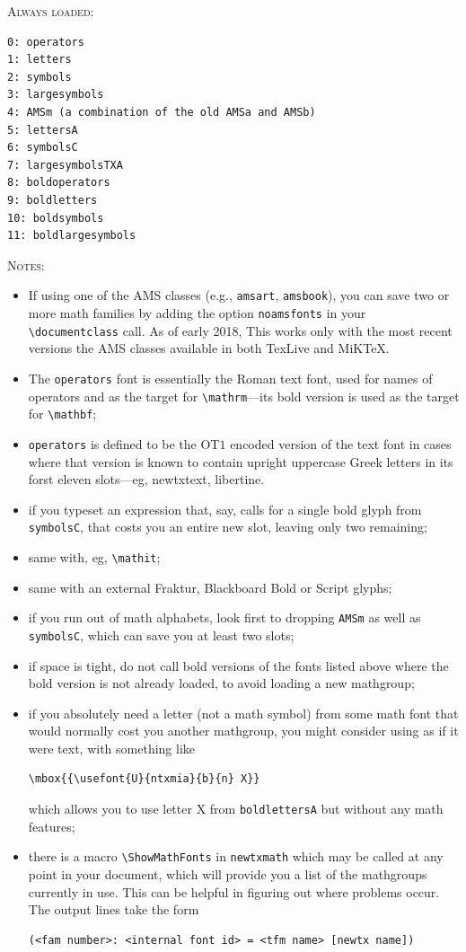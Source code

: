 \documentclass[11pt]{article}
\theoremstyle{oldplain}
\theoremstyle{plain}
\begin{document}
\textsc{Always loaded:}
\begin{verbatim}
0: operators
1: letters
2: symbols
3: largesymbols
4: AMSm (a combination of the old AMSa and AMSb)
5: lettersA
6: symbolsC
7: largesymbolsTXA
8: boldoperators
9: boldletters
10: boldsymbols
11: boldlargesymbols
\end{verbatim}
\textsc{Notes:}
\begin{itemize}
\item If using one of the AMS classes (e.g., {\tt amsart}, {\tt amsbook}), you can save two or more math families by adding the option {\tt noamsfonts} in your \verb|\documentclass| call. As of early 2018, This works only with the most recent versions the AMS classes available in both TexLive and MiKTeX. 
\item
The {\tt operators} font is essentially the Roman text font, used for names of operators and as the target for \verb|\mathrm|---its bold version is used as the target for \verb|\mathbf|;
\item {\tt operators} is defined to be the OT$1$ encoded version of the text font in cases where that version is known to contain upright uppercase Greek letters in its forst eleven slots---eg, newtxtext, libertine.
\item if you typeset an expression that, say, calls for a single bold glyph from  {\tt symbolsC}, that costs you an entire new slot, leaving only two remaining;
\item same with, eg, \verb|\mathit|;
\item same with an external Fraktur, Blackboard Bold or Script glyphs;
\item if you run out of math alphabets, look first to dropping {\tt AMSm}  as well as {\tt symbolsC}, which can save you at least two slots;
\item if space is tight, do not call bold versions of the fonts listed above where the bold version is not already loaded, to avoid loading a new mathgroup; 
\item if you absolutely need a letter (not a math symbol) from some math font that would normally cost you another mathgroup, you might consider using as if it were text, with something like
\begin{verbatim}
\mbox{{\usefont{U}{ntxmia}{b}{n} X}}
\end{verbatim}
which allows you to use letter X from {\tt boldlettersA} but without any math features;
\item there is a macro \verb|\ShowMathFonts| in {\tt newtxmath} which may be called at any point in your document, which will provide you a list of the mathgroups currently in use. This can be helpful in figuring out where problems occur. The output lines take the form
\begin{verbatim}
(<fam number>: <internal font id> = <tfm name> [newtx name])
\end{verbatim}

\end{itemize}
\end{document}
